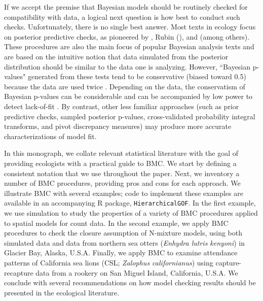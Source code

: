 \documentclass[12pt,english]{article}
\begin{document}
\begin{spacing}{1.9}
If we accept the premise that Bayesian models should be
routinely checked for compatibility with data, a logical next question
is how best to conduct such checks.  Unfortunately, there is no single
best answer.  Most texts in ecology
\citep[e.g.,][]{KingEtAl2009,LinkBarker2010,KerySchaub2012} focus on
posterior predictive checks, as pioneered by \citet{Guttman1967},
Rubin (\citeyear{Rubin1981,Rubin1984}), and \citet{GelmanEtAl1996}
(among others).  These procedures are also the main focus of popular
Bayesian analysis texts
\citep[e.g.,][]{CressieWikle2011,GelmanEtAl2014} and are based on the
intuitive notion that data simulated from the posterior distribution
should be similar to the data one is analyzing.  However, ``Bayesian
p-values" generated from these tests tend to be conservative (biased
toward 0.5) because the data are used twice \citep[once to fit the
model and once to test the
model;][]{BayarriBerger2000,RobinsEtAl2000}.  Depending on the data,
the conservatism of Bayesian p-values can be considerable
\citep{Zhang2014} and can be accompanied by low power to detect
lack-of-fit \citep{YuanJohnson2012,Zhang2014}. By contrast, other
less familiar approaches (such as prior predictive
checks, sampled posterior p-values, cross-validated probability
integral transforms, and pivot discrepancy measures) may produce more
accurate characterizations of model fit.

In this monograph, we collate relevant statistical literature
with the goal of providing ecologists with a practical guide to
BMC.  We start by defining a consistent notation
that we use throughout the paper. Next, we inventory a number
of BMC procedures, providing pros and cons for each approach.  We illustrate BMC with several examples; code to implement these examples are available in an accompanying R package, \texttt{HierarchicalGOF}.  In the first example, we use simulation to study the properties of a variety of BMC procedures applied to spatial models for count data.  In the second example, we apply BMC procedures to check the closure assumption of N-mixture models, using both simulated data and data from northern sea otters (\textit{Enhydra lutris kenyoni}) in Glacier Bay,
Alaska, U.S.A.  Finally, we apply BMC to examine attendance patterns of California sea lions (CSL; {\it Zalophus californianus}) using capture-recapture data from a rookery on San Miguel Island, California, U.S.A.
We conclude with several recommendations on how model
checking results should be presented in the ecological literature.




\end{spacing}
\end{document}
